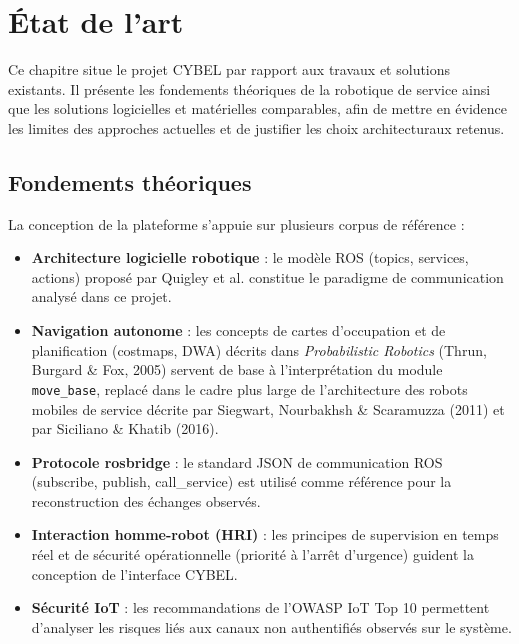 \newpage
\section{État de l'art}
\label{chap:etat_art}

Ce chapitre situe le projet CYBEL par rapport aux travaux et solutions
existants. Il présente les fondements théoriques de la robotique de service
ainsi que les solutions logicielles et matérielles comparables, afin de
mettre en évidence les limites des approches actuelles et de justifier les
choix architecturaux retenus.

\subsection{Fondements théoriques}
\label{subsec:fondements_theoriques}

La conception de la plateforme s'appuie sur plusieurs corpus de référence :

\begin{itemize}
    \item \textbf{Architecture logicielle robotique} : le modèle ROS
    (topics, services, actions) proposé par Quigley et al. constitue le
    paradigme de communication analysé dans ce projet.

    \item \textbf{Navigation autonome} : les concepts de cartes
    d'occupation et de planification (costmaps, DWA) décrits dans
    \textit{Probabilistic Robotics} (Thrun, Burgard \& Fox, 2005)
    servent de base à l'interprétation du module \texttt{move\_base}, replacé
    dans le cadre plus large de l'architecture des robots mobiles de service
    décrite par Siegwart, Nourbakhsh \& Scaramuzza (2011) et par Siciliano \&
    Khatib (2016).

    \item \textbf{Protocole rosbridge} : le standard JSON de communication
    ROS (subscribe, publish, call\_service) est utilisé comme référence pour
    la reconstruction des échanges observés.

    \item \textbf{Interaction homme-robot (HRI)} : les principes de
    supervision en temps réel et de sécurité opérationnelle (priorité à
    l'arrêt d'urgence) guident la conception de l'interface CYBEL.

    \item \textbf{Sécurité IoT} : les recommandations de l'OWASP IoT Top 10
    permettent d'analyser les risques liés aux canaux non authentifiés
    observés sur le système.
\end{itemize}

